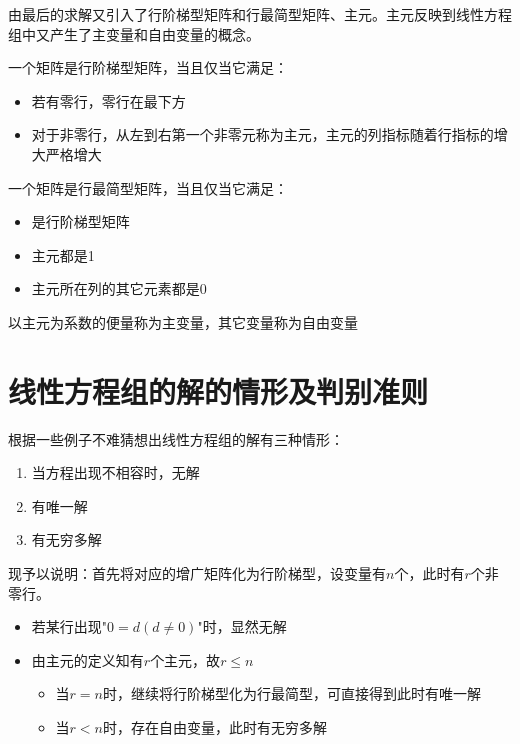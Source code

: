 由最后的求解又引入了行阶梯型矩阵和行最简型矩阵、主元。主元反映到线性方程组中又产生了主变量和自由变量的概念。
\begin{definition}[行阶梯形矩阵]
    一个矩阵是行阶梯型矩阵，当且仅当它满足：
    \begin{itemize}
        \item 若有零行，零行在最下方
        \item 对于非零行，从左到右第一个非零元称为主元，主元的列指标随着行指标的增大严格增大
    \end{itemize}
\end{definition}
\begin{definition}[行最简型矩阵]
    一个矩阵是行最简型矩阵，当且仅当它满足：
    \begin{itemize}
        \item 是行阶梯型矩阵
        \item 主元都是1
        \item 主元所在列的其它元素都是0
    \end{itemize}
\end{definition}
\begin{definition}[主变量]
    以主元为系数的便量称为主变量，其它变量称为自由变量
\end{definition}

\section{线性方程组的解的情形及判别准则}
根据一些例子不难猜想出线性方程组的解有三种情形：
\begin{enumerate}
    \item 当方程出现不相容时，无解
    \item 有唯一解
    \item 有无穷多解
\end{enumerate}
现予以说明：首先将对应的增广矩阵化为行阶梯型，设变量有$n$个，此时有$r$个非零行。
\begin{itemize}
    \item 若某行出现"$0=d(d\neq 0)$"时，显然无解
    \item 由主元的定义知有$r$个主元，故$r\leq n$\begin{itemize}
        \item 当$r=n$时，继续将行阶梯型化为行最简型，可直接得到此时有唯一解
        \item 当$r<n$时，存在自由变量，此时有无穷多解
    \end{itemize}
\end{itemize}

